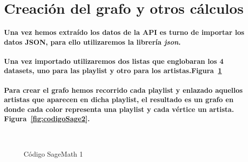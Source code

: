 \documentclass[11pt,spanish]{article}
\begin{document}
\pagebreak

\section{Creación del grafo y otros cálculos}

\paragraph*{Una vez hemos extraído los datos de la API es turno de importar los datos JSON, para ello utilizaremos la librería \emph{json}.}

\paragraph*{Una vez importado utilizaremos dos listas que englobaran los 4 datasets, uno para las playlist y otro para los artistas.Figura~\ref{fig:codigoSage1}}

\paragraph*{Para crear el grafo hemos recorrido cada playlist y enlazado aquellos artistas que aparecen en dicha playlist, 
el resultado es un grafo en donde cada color representa una playlist y cada vértice un artista. Figura~\ref{fig:codigoSage2}.}



\begin{figure}[H]
	\begin{center}
%
	   
	   \\ %
	  
%
	\end{center}
	\caption{%
	Código SageMath 1
 	}%
	\label{fig:codigoSage1}
\end{figure}
\end{document}

